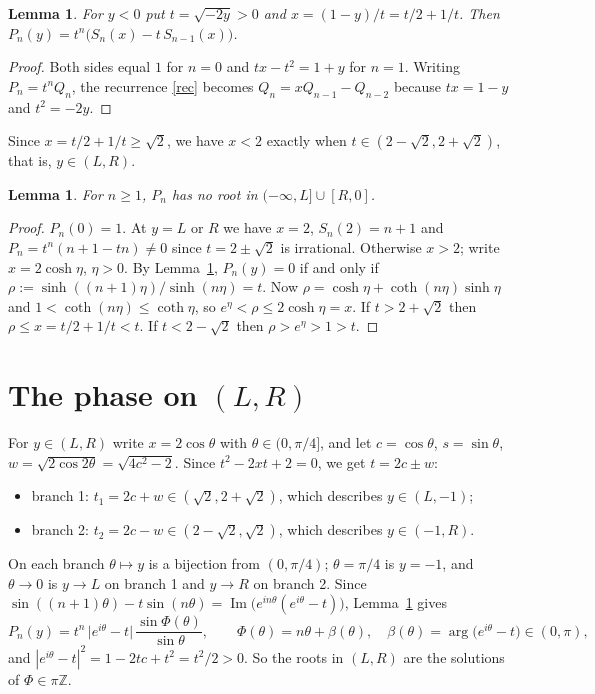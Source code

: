 \documentclass[11pt]{article}
\newtheorem{lemma}[theorem]{Lemma}
\theoremstyle{remark}\newtheorem{remark}[theorem]{Remark}
\begin{document}
\begin{lemma}\label{cheb}
For $y<0$ put $t=\sqrt{-2y}>0$ and $x=(1-y)/t=t/2+1/t$. Then $P_n(y)=t^n\bigl(S_n(x)-t\,S_{n-1}(x)\bigr)$.
\end{lemma}
\begin{proof}
Both sides equal $1$ for $n=0$ and $tx-t^2=1+y$ for $n=1$. Writing $P_n=t^nQ_n$, the recurrence \eqref{rec}
becomes $Q_n=xQ_{n-1}-Q_{n-2}$ because $tx=1-y$ and $t^2=-2y$.
\end{proof}
Since $x=t/2+1/t\ge\sqrt2$, we have $x<2$ exactly when $t\in(2-\sqrt2,2+\sqrt2)$, that is, $y\in(L,R)$.

\begin{lemma}\label{outside}
For $n\ge1$, $P_n$ has no root in $(-\infty,L]\cup[R,0]$.
\end{lemma}
\begin{proof}
$P_n(0)=1$. At $y=L$ or $R$ we have $x=2$, $S_n(2)=n+1$ and $P_n=t^n(n+1-tn)\ne0$ since $t=2\pm\sqrt2$
is irrational. Otherwise $x>2$; write $x=2\cosh\eta$, $\eta>0$. By Lemma~\ref{cheb}, $P_n(y)=0$ if and only if
$\rho:=\sinh((n+1)\eta)/\sinh(n\eta)=t$. Now $\rho=\cosh\eta+\coth(n\eta)\sinh\eta$ and
$1<\coth(n\eta)\le\coth\eta$, so $e^\eta<\rho\le2\cosh\eta=x$. If $t>2+\sqrt2$ then $\rho\le x=t/2+1/t<t$.
If $t<2-\sqrt2$ then $\rho>e^\eta>1>t$.
\end{proof}

\section{The phase on $(L,R)$}
For $y\in(L,R)$ write $x=2\cos\theta$ with $\theta\in(0,\pi/4]$, and let $c=\cos\theta$, $s=\sin\theta$,
$w=\sqrt{2\cos2\theta}=\sqrt{4c^2-2}$. Since $t^2-2xt+2=0$, we get $t=2c\pm w$:
\begin{itemize}
\item branch 1: $t_1=2c+w\in(\sqrt2,2+\sqrt2)$, which describes $y\in(L,-1)$;
\item branch 2: $t_2=2c-w\in(2-\sqrt2,\sqrt2)$, which describes $y\in(-1,R)$.
\end{itemize}
On each branch $\theta\mapsto y$ is a bijection from $(0,\pi/4)$; $\theta=\pi/4$ is $y=-1$, and
$\theta\to0$ is $y\to L$ on branch 1 and $y\to R$ on branch 2. Since
$\sin((n+1)\theta)-t\sin(n\theta)=\operatorname{Im}\bigl(e^{in\theta}(e^{i\theta}-t)\bigr)$, Lemma~\ref{cheb} gives
\begin{equation}\label{phase}
P_n(y)=t^n\,\bigl|e^{i\theta}-t\bigr|\,\frac{\sin\Phi(\theta)}{\sin\theta},\qquad
\Phi(\theta)=n\theta+\beta(\theta),\quad \beta(\theta)=\arg\bigl(e^{i\theta}-t\bigr)\in(0,\pi),
\end{equation}
and $|e^{i\theta}-t|^2=1-2tc+t^2=t^2/2>0$. So the roots in $(L,R)$ are the solutions of $\Phi\in\pi\mathbb Z$.
\end{document}
